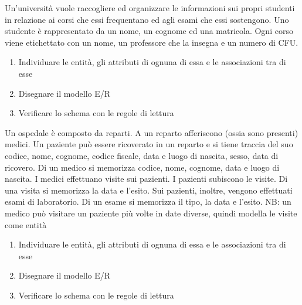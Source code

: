 \documentclass[addpoints]{exam}
\begin{document}
 
\begin{center}
\end{center}
 
\vspace{5mm}
 
 
\vspace{5mm}
 
 
\begin{questions}
	
\question[5]Un'università vuole raccogliere ed organizzare le informazioni sui propri studenti in relazione ai corsi che essi frequentano ed agli esami che essi sostengono. Uno studente è rappresentato da un nome, un cognome ed una matricola. Ogni corso viene etichettato con un nome, un professore che la insegna e un numero di CFU. 
\begin{enumerate}
	\item Individuare le entità, gli attributi di ognuna di essa e le associazioni tra di esse
	\item Disegnare il modello E/R
	\item Verificare lo schema con le regole di lettura
\end{enumerate}
 
\question[5] 	Un ospedale è composto da reparti. A un reparto afferiscono (ossia sono presenti) medici. Un paziente può essere ricoverato in un reparto e si tiene traccia del suo codice, nome, cognome, codice fiscale, data e luogo di nascita, sesso, data di ricovero. Di un medico si memorizza codice, nome, cognome, data e luogo di nascita. I medici effettuano visite sui pazienti. I pazienti subiscono le visite. Di una visita si memorizza la data e l’esito. Sui pazienti, inoltre, vengono effettuati esami di laboratorio. Di un esame si memorizza il tipo, la data e l’esito. NB: un medico può visitare un paziente più volte in date diverse, quindi modella le visite come entità
\begin{enumerate}
	\item Individuare le entità, gli attributi di ognuna di essa e le associazioni tra di esse
	\item Disegnare il modello E/R
	\item Verificare lo schema con le regole di lettura
\end{enumerate}

\end{questions}

\begin{center}
	\gradetable[h][questions]
\end{center}
\end{document}
